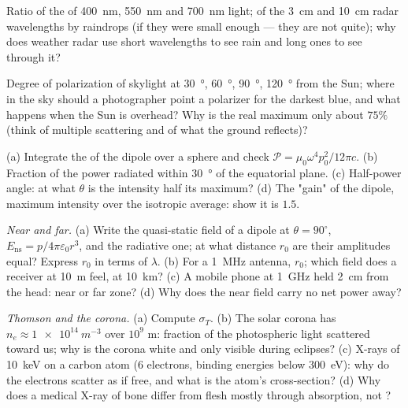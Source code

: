 \begin{exercise}[$\star$]\label{exo:b2:dipole-radiation:3}
Ratio of the  of \qty{400}{nm}, \qty{550}{nm} and
\qty{700}{nm} light; of the \qty{3}{cm} and \qty{10}{cm} radar wavelengths by
raindrops (if they were small enough --- they are not quite); why does
weather radar use short wavelengths to see rain and long ones to see
through it?
\end{exercise}

\begin{exercise}[$\star$]\label{exo:b2:dipole-radiation:4}
Degree of polarization of skylight at \qty{30}{\degree}, \qty{60}{\degree},
\qty{90}{\degree}, \qty{120}{\degree} from the Sun; where in the sky should a
photographer point a polarizer for the darkest blue, and what
happens when the Sun is overhead? Why is the real maximum only about
$75\%$ (think of multiple scattering and of what the ground reflects)?
\end{exercise}

\begin{exercise}[$\star\star$]\label{exo:b2:dipole-radiation:5}
(a) Integrate the  of the dipole over a sphere and
check $\mathcal P = \mu_0\omega^4p_0^2/12\pi c$. (b) Fraction of the power
radiated within \qty{30}{\degree} of the equatorial plane. (c) Half-power
angle: at what $\theta$ is the intensity half its maximum? (d) The
"gain" of the dipole, maximum intensity over the isotropic average:
show it is $1.5$.
\end{exercise}

\begin{exercise}[$\star\star$]\label{exo:b2:dipole-radiation:6}
\emph{Near and far.} (a) Write the quasi-static field of a dipole at
$\theta = 90^\circ$, $E_{\text{ns}} = p/4\pi\varepsilon_0r^3$, and the radiative one; at
what distance $r_0$ are their amplitudes equal? Express $r_0$ in terms of
$\lambda$. (b) For a \qty{1}{MHz} antenna, $r_0$; which field does a receiver
at \qty{10}{m} feel, at \qty{10}{km}? (c) A mobile phone at \qty{1}{GHz} held
\qty{2}{cm} from the head: near or far zone? (d) Why does the near field
carry no net power away?
\end{exercise}

\begin{exercise}[$\star\star$]\label{exo:b2:dipole-radiation:7}
\emph{Thomson and the corona.} (a) Compute $\sigma_T$. (b) The solar corona
has $n_e \approx \qty{1e14}{m^{-3}}$ over $10^9$ m: fraction of the photospheric
light scattered toward us; why is the corona white and only visible
during eclipses? (c) X-rays of \qty{10}{keV} on a carbon atom ($6$
electrons, binding energies below \qty{300}{eV}): why do the electrons
scatter as if free, and what is the atom's cross-section? (d) Why
does a medical X-ray of bone differ from flesh mostly through
absorption, not ?
\end{exercise}

